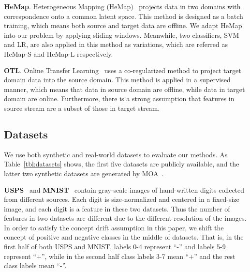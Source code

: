 \textbf{HeMap}. Heterogeneous Mapping (HeMap)~\cite{shi2010transfer} projects data in two domains with correspondence onto a common latent space. This method is designed as a batch training, which means both source and target data are offline. We adapt HeMap into our problem by applying sliding windows. Meanwhile, two classifiers, SVM and LR, are also applied in this method as variations, which are referred as HeMap-S and HeMap-L respectively. 


\textbf{OTL}. Online Transfer Learning~\cite{zhao2010otl} uses a co-regularized method to project target domain data into the source domain. This method is applied in a supervised manner, which means that data in source domain are offline, while data in target domain are online. Furthermore, there is a strong assumption that features in source stream are a subset of those in target stream.

\subsection{Datasets}
\label{sec:datasets}




We use both synthetic and real-world datasets to evaluate our methods. As Table~\ref{tbl:datasets} shows, the first five datasets are publicly available, and the latter two synthetic datasets are generated by MOA~\cite{bifet2010moa}. 

\textbf{USPS}~\cite{hull1994database} and \textbf{MNIST}~\cite{lecun1998gradient} contain gray-scale images of hand-written digits collected from different sources. 
Each digit is size-normalized and centered in a fixed-size image, and each digit is a feature in these two datasets. Thus the number of features in two datasets are different due to the different resolution of the images.
In order to satisfy the concept drift assumption in this paper, we shift the concept of positive and negative classes in the middle of datasets. 
That is, in the first half of both USPS and MNIST, labels 0-4 represent ``-'' and labels 5-9 represent ``+'', while in the second half class labels 3-7 mean ``+'' and the rest class labels mean ``-''.

